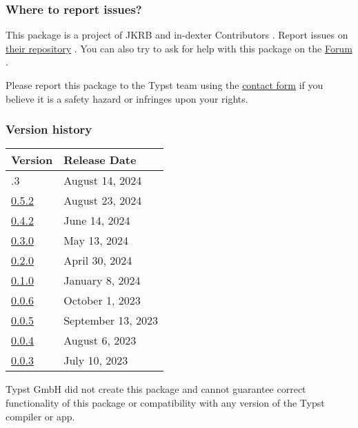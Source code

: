 \subsubsection{Where to report issues?}\label{where-to-report-issues}

This package is a project of JKRB and in-dexter Contributors . Report
issues on \href{https://github.com/RolfBremer/in-dexter}{their
repository} . You can also try to ask for help with this package on the
\href{https://forum.typst.app}{Forum} .

Please report this package to the Typst team using the
\href{https://typst.app/contact}{contact form} if you believe it is a
safety hazard or infringes upon your rights.

\label{versions}
\subsubsection{Version history}\label{version-history}

\begin{longtable}[]{@{}ll@{}}
\toprule\noalign{}
Version & Release Date \\
\midrule\noalign{}
\endhead
\bottomrule\noalign{}
\endlastfoot
0.5.3 & August 14, 2024 \\
\href{https://typst.app/universe/package/in-dexter/0.5.2/}{0.5.2} &
August 23, 2024 \\
\href{https://typst.app/universe/package/in-dexter/0.4.2/}{0.4.2} & June
14, 2024 \\
\href{https://typst.app/universe/package/in-dexter/0.3.0/}{0.3.0} & May
13, 2024 \\
\href{https://typst.app/universe/package/in-dexter/0.2.0/}{0.2.0} &
April 30, 2024 \\
\href{https://typst.app/universe/package/in-dexter/0.1.0/}{0.1.0} &
January 8, 2024 \\
\href{https://typst.app/universe/package/in-dexter/0.0.6/}{0.0.6} &
October 1, 2023 \\
\href{https://typst.app/universe/package/in-dexter/0.0.5/}{0.0.5} &
September 13, 2023 \\
\href{https://typst.app/universe/package/in-dexter/0.0.4/}{0.0.4} &
August 6, 2023 \\
\href{https://typst.app/universe/package/in-dexter/0.0.3/}{0.0.3} & July
10, 2023 \\
\end{longtable}

Typst GmbH did not create this package and cannot guarantee correct
functionality of this package or compatibility with any version of the
Typst compiler or app.
